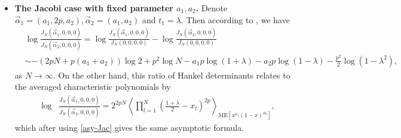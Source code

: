\documentclass[11pt,a4paper]{article}
\numberwithin{equation}{section} %
\theoremstyle{plain}
\theoremstyle{definition}
\numberwithin{prop}{section}
\numberwithin{cor}{section}
\numberwithin{remark}{section}
\begin{document}
\begin{itemize}
    \begin{align}\label{aym-b=2}
        \left\langle\prod_{l=1}^{N}(\lambda-x_l)^{2p}\right\rangle_{\mathrm{ME}_{2,N}[e^{-NV(x)}]}\sim \exp\left(C_1N+C_2\log N+C_3\right),
    \end{align}
    where
    \begin{align}\label{C1-3}
    \begin{aligned}
        &C_1=-2p\log2-\frac{p}{\pi}\int_{-1}^{1}\frac{V(x)}{\sqrt{1-x^2}}dx+pV(\lambda),\quad C_2=p^2,\\
        &C_3=p^2\log\left(\frac{\pi}{2}\psi(\lambda)\right)+p^2\log 2\sqrt{1-\lambda^2}+\log\frac{G(1+p)^2}{G(1+2p)}.
    \end{aligned}
    \end{align}
    Proceed with the evaluation of the definite integral 
    \begin{align}\label{int-1}
        \int_{-1}^{1}\frac{\log(ax+b)}{\sqrt{1-x^2}}dx=\pi\log\left(\frac{b+\sqrt{b^2-a^2}}{2}\right),
    \end{align}
    we have
    \begin{align}
&C_1=p(-2\log2+\alpha\log(\alpha+1)+2\sqrt{\alpha+1}\lambda-\alpha\log(2\sqrt{\alpha+1}\lambda+\alpha+2)),\\
        &C_2=p^2,\quad C_3=p^2\log\left(\frac{2(\alpha+1)}{2\sqrt{\alpha+1}\lambda+\alpha+2}\sqrt{1-\lambda^2}\right)+\log\frac{G(1+p)^2}{G(1+2p)}.
    \end{align}
    On the other hand, change of variables in the multiple integral shows
    \begin{align}
        \left\langle\prod_{l=1}^{N}(\lambda-x_l)^{2p}\right\rangle_{\mathrm{ME}_{2,N}[e^{-NV(x)}]}=(2\sqrt{\alpha+1})^{-2pN}\left\langle\prod_{l=1}^{N}(2\sqrt{\alpha+1}\lambda+\alpha+2-x_l)^{2p}\right\rangle_{\mathrm{ME}_{2,N}[x^{ N\alpha}e^{-Nx}]},
    \end{align}
    which upon using \eqref{A-LbetaE2} gives the same asymptotic formula.

    \item \textbf{The Jacobi case with fixed parameter $a_1,a_2$.} Denote $\vec{\alpha}_1=(a_1,2p,a_2),\vec{\alpha}_2=(a_1,a_2)$ and $t_1=\lambda$. Then according to \cite[Theorem 6.2]{CG21}, we have
    \begin{align}
        &\log\frac{J_N(\vec{\alpha}_1,0,0,0)}{J_N(\vec{\alpha}_2,0,0,0)}=\log \frac{J_N(\vec{\alpha}_1,0,0,0)}{J_N(0,0,0,0)}-\log \frac{J_N(\vec{\alpha}_2,0,0,0)}{J_N(0,0,0,0)}\\
        &\sim -(2pN+p(a_1+a_2))\log2+p^2\log N-a_1p\log(1+\lambda)-a_2p\log(1-\lambda)-\frac{p^2}{2}\log(1-\lambda^2),
    \end{align}
    as $N\to\infty$. On the other hand, this ratio of Hankel determinants relates to the  averaged characteristic polynomials by
    \begin{align}
        \log &\frac{J_N(\vec{\alpha}_1,0,0,0)}{J_N(\vec{\alpha}_2,0,0,0)}=2^{2pN}\left\langle\prod_{l=1}^{N}\left(\frac{1+\lambda}{2}-x_l\right)^{2p}\right\rangle_{\mathrm{ME}[x^{a_1}(1-x)^{a_2}]},
    \end{align}
    which after using \eqref{asy-Jac} gives the same asymptotic formula.


\end{itemize}
\end{document}
